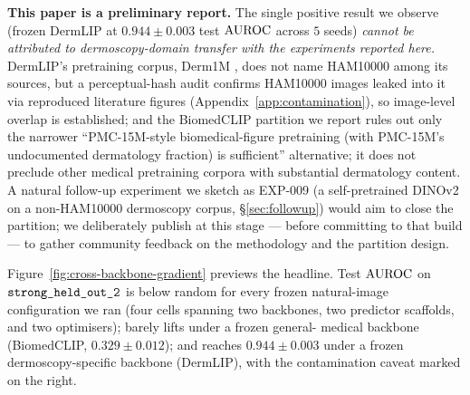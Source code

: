 \textbf{This paper is a preliminary report.} The single positive result we
observe (frozen DermLIP at $0.944 \pm 0.003$ test $\mathrm{AUROC}$ across $5$ seeds)
\emph{cannot be attributed to dermoscopy-domain transfer with the experiments
reported here.} DermLIP's pretraining corpus, Derm1M
\citep{yan2025derm1m}, does not name HAM10000 among its sources, but a
perceptual-hash audit confirms HAM10000 images leaked into it via reproduced
literature figures (Appendix~\ref{app:contamination}), so image-level overlap
is established; and the
BiomedCLIP partition we report rules out only the narrower
``PMC-15M-style biomedical-figure pretraining (with PMC-15M's
undocumented dermatology fraction) is sufficient'' alternative; it
does not preclude other medical pretraining corpora with substantial
dermatology content. A natural follow-up experiment
we sketch as EXP-009 (a self-pretrained DINOv2 on a non-HAM10000
dermoscopy corpus, \S\ref{sec:followup}) would aim to close the
partition; we deliberately publish at this stage --- before committing
to that build --- to gather community feedback on the methodology and
the partition design.

Figure~\ref{fig:cross-backbone-gradient} previews the headline. Test $\mathrm{AUROC}$
on $\texttt{strong\_held\_out\_2}$ is below random for every frozen natural-image
configuration we ran (four cells spanning two backbones, two predictor
scaffolds, and two optimisers); barely lifts under a frozen general-
medical backbone (BiomedCLIP, $0.329 \pm 0.012$); and reaches
$0.944 \pm 0.003$ under a frozen dermoscopy-specific backbone (DermLIP),
with the contamination caveat marked on the right.

